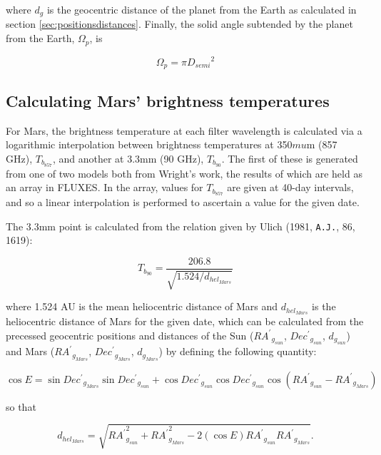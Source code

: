 \documentclass[11pt,twoside]{article}
\newcommand{\xlabel}[1]{}
\renewcommand{\_}{\texttt{\symbol{95}}}
\begin{document}
where $d_g$ is the geocentric distance of the planet from the Earth as calculated in section \ref{sec:positionsdistances}.  Finally, the solid angle subtended by the planet from the Earth, $\Omega_p$, is

\begin{displaymath}
\Omega_p = \pi {D_{semi}}^2
\end{displaymath}

\subsection{Calculating Mars' brightness temperatures}
\xlabel{marsbright}
\label{sec:marsbright}

For Mars, the brightness temperature at each filter wavelength is calculated via a logarithmic interpolation between brightness temperatures at 350$mu$m (857 GHz), $T_{b_{857}}$, and another at 3.3mm (90 GHz), $T_{b_{90}}$.  The first of these is generated from one of two models both from Wright's work, the results of which are held as an array in FLUXES.  In the array, values for $T_{b_{857}}$ are given at 40-day intervals, and so a linear interpolation is performed to ascertain a value for the given date.

The 3.3mm point is calculated from the relation given by Ulich (1981, {\tt{A.J.}}, 86, 1619):

\begin{displaymath}
T_{b_{90}} = \frac{206.8}{\sqrt{1.524/d_{hel_{Mars}}}}
\end{displaymath}

where 1.524 AU is the mean heliocentric distance of Mars and $d_{hel_{Mars}}$ is the heliocentric distance of Mars for the given date, which can be calculated from the precessed geocentric positions and distances of the Sun (${RA^\prime}_{g_{sun}}$, ${Dec^\prime}_{g_{sun}}$, $d_{g_{sun}}$) and Mars (${RA^\prime}_{g_{Mars}}$, ${Dec^\prime}_{g_{Mars}}$, $d_{g_{Mars}}$) by defining the following quantity:

\begin{displaymath}
\cos E = \sin {Dec^\prime}_{g_{Mars}} \sin {Dec^\prime}_{g_{sun}} + \cos {Dec^\prime}_{g_{sun}} \cos {Dec^\prime}_{g_{sun}} \cos ({RA^\prime}_{g_{sun}} - {RA^\prime}_{g_{Mars}})
\end{displaymath}

so that

\begin{displaymath}
d_{hel_{Mars}} = \sqrt{{RA^\prime}_{g_{sun}}^2 + {RA^\prime}_{g_{Mars}}^2 - 2 (\cos E){RA^\prime}_{g_{sun}}{RA^\prime}_{g_{Mars}}}.
\end{displaymath}
\end{document}
